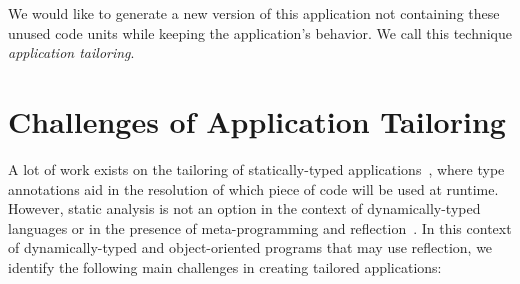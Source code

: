 We would like to generate a new version of this application not containing these unused code units while keeping the application's behavior. We call this technique \emph{application tailoring}.

\section{Challenges of Application Tailoring} \label{sec:challenges}

A lot of work exists on the tailoring of statically-typed applications~\cite{Cour10a,Rays02a,Tip03a,Popa04a,Teod01a}, where type annotations aid in the resolution of which piece of code will be used at runtime. 
However, static analysis is not an option in the context of dynamically-typed languages or in the presence of meta-programming and reflection~\cite{Livs05a}.
In this context of dynamically-typed and object-oriented programs that may use reflection, we identify the following main challenges in creating tailored applications:

